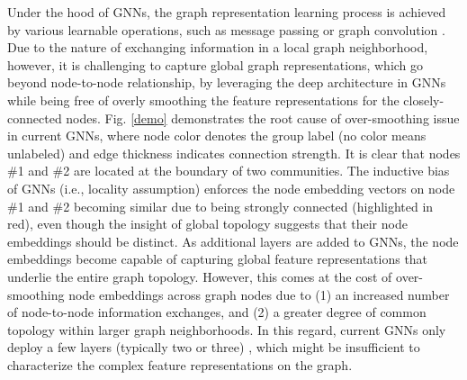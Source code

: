 \documentclass{article}
\begin{document}

Under the hood of GNNs, the graph representation learning process is achieved by various learnable operations, such as message passing \cite{michaelbeyond2022} or graph convolution \cite{kipf2016semi}. Due to the nature of exchanging information in a local graph neighborhood, however, it is challenging to capture global graph representations, which go beyond node-to-node relationship, by leveraging the deep architecture in GNNs while being free of overly smoothing the feature representations for the closely-connected nodes. Fig. \ref{demo} demonstrates the root cause of over-smoothing issue in current GNNs, where node color denotes the group label (no color means unlabeled) and edge thickness indicates connection strength. It is clear that nodes \#1 and \#2 are located at the boundary of two communities. The inductive bias of GNNs (i.e., locality  assumption) enforces the node embedding vectors on node \#1 and \#2 becoming similar due to being strongly connected (highlighted in red), even though the insight of global topology suggests that their node embeddings should be distinct. As additional layers are added to GNNs, the node embeddings become capable of capturing global feature representations that underlie the entire graph topology. However, this comes at the cost of over-smoothing node embeddings across graph nodes due to (1) an increased number of node-to-node information exchanges, and (2) a greater degree of common topology within larger graph neighborhoods. In this regard, current GNNs only deploy a few layers (typically two or three) \cite{li2018deeper}, which might be insufficient to characterize the complex feature representations on the graph.
\end{document}
